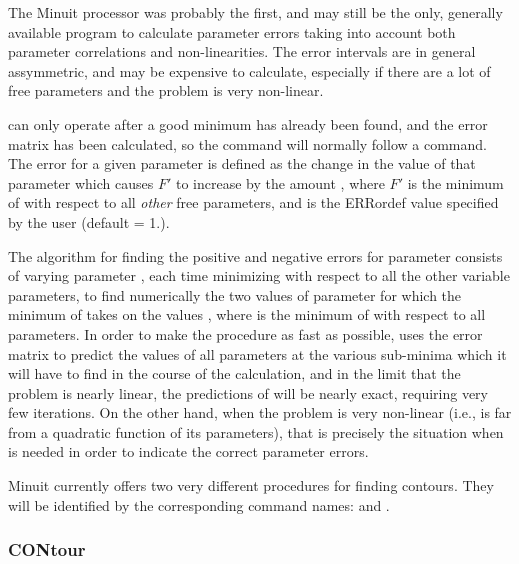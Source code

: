 The Minuit processor  was probably the first, and may still be the only,
generally available program to calculate parameter errors taking into
account both parameter correlations and non-linearities.
The  error intervals are in general assymmetric, and may be expensive
to calculate, especially if there are a lot of free parameters and the
problem is very non-linear.
 
 can only operate after a good minimum has already been found, and
the error matrix has been calculated, so the  command will
normally follow a  command.
The  error for a given parameter is defined as the change in the
value of that parameter which causes $F'$ to increase by the amount ,
where $F'$ is the minimum of  with respect to all {\it other}
free parameters, and  is the ERRordef value specified by the
user (default = 1.).
 
The algorithm for finding the positive and negative  errors for
parameter  consists of varying parameter , each time minimizing
 with respect to all the other  variable parameters,
to find numerically the two values of parameter  for which the
minimum of  takes on the values , where  is the
minimum of  with respect to all  parameters.
In order to make the procedure as fast as possible,  uses the
error matrix to predict the values of all parameters at the
various sub-minima which it will have to find in the course of the
calculation, and in the limit that the problem is nearly linear,
the predictions of  will be nearly exact, requiring very
few iterations.  On the other hand, when the problem is very
non-linear (i.e.,  is far from a quadratic function of its
parameters), that is precisely the situation when  is needed
in order to indicate the correct parameter errors.


Minuit currently offers two very different procedures for finding
 contours.  They will be identified by the corresponding
command names:  and .
 
\subsubsection{CONtour}

